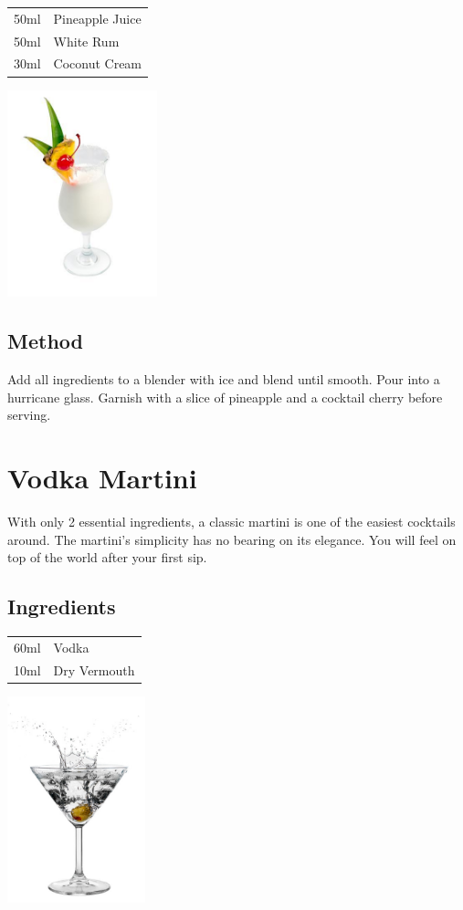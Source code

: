 \documentclass[12pt, letterpaper]{article}
\begin{document}
\begin{multicols}{2}

\begin{tabular} { r | l}
    50ml & Pineapple Juice \\
    50ml & White Rum \\
    30ml & Coconut Cream
\end{tabular}

\includegraphics[height=6cm]{pinacolada}

\end{multicols}

\subsection*{Method}
Add all ingredients to a blender with ice and blend until smooth.
Pour into a hurricane glass. Garnish with a slice of pineapple and a cocktail cherry before serving.

\pagebreak
\section{Vodka Martini}
With only 2 essential ingredients, a classic martini is one of the easiest cocktails around.
The martini's simplicity has no bearing on its elegance.
You will feel on top of the world after your first sip.
\subsection*{Ingredients}

\begin{multicols}{2}

\begin{tabular} { r | l}
    60ml & Vodka \\
    10ml & Dry Vermouth 
\end{tabular}

\includegraphics[height=6cm]{vodkamartini}

\end{multicols}
\end{document}
